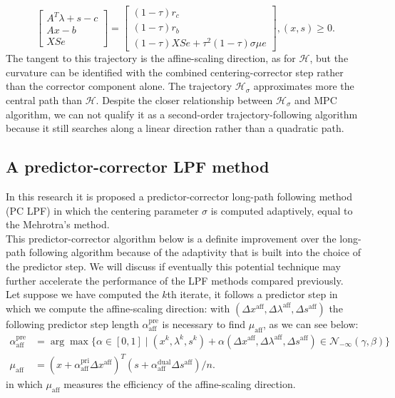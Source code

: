 \documentclass[a4paper,10 pt,titlepage,twoside]{book}
\theoremstyle{plain}
\theoremstyle{definition}
\theoremstyle{remark}
\begin{document}
\begin{equation}\label{Tt}
\begin{bmatrix}
A^{T}\lambda+s-c \\Ax-b \\XSe
\end{bmatrix}=\begin{bmatrix}
(1-\tau)r_{c}\\(1-\tau)r_{b}\\(1-\tau)XSe+\tau^{2}(1-\tau)\sigma\mu e
\end{bmatrix},(x,s)\geq0.
\end{equation}
The tangent to this trajectory is the affine-scaling direction, as for $\mathcal{H}$, but the curvature can be identified with the combined centering-corrector step rather than the corrector component alone. The trajectory $\mathcal{H}_{\sigma}$ approximates more the central path than $\mathcal{H}$. Despite the closer relationship between $\mathcal{H}_{\sigma}$  and MPC algorithm, we can not qualify it as a second-order trajectory-following algorithm because it still searches along a linear direction rather than a quadratic path.  
\subsection{A predictor-corrector LPF method}
In this research it is proposed a predictor-corrector long-path following method (PC LPF) in which the centering parameter $\sigma$ is computed adaptively, equal to the Mehrotra's method.\\
This predictor-corrector algorithm below is a definite improvement over the long-path following algorithm because of the adaptivity that is built into the choice of the predictor step. We will discuss if eventually this potential
technique may further accelerate the performance of the LPF methods compared previously.\\

Let suppose we have computed the $k$th iterate, it follows a predictor step in which we compute the affine-scaling direction: with $(\Delta x^{\text{aff}},\Delta \lambda^{\text{aff}},\Delta s^{\text{aff}})$ the following predictor step length $\alpha_{\text{aff}}^{\text{pre}}$ is necessary to find $\mu_{\text{aff}}$, as we can see below:
\begin{align}
\alpha_{\text{aff}}^{\text{pre}}&=\arg\max\{\alpha\in[0,1]\;|\;(x^{k}, \lambda^{k}, s^{k})+ \alpha(\Delta x^{\text{aff}}, \Delta\lambda^{\text{aff}}, \Delta s^{\text{aff}})\in\mathcal{N}_{-\infty}(\gamma,\beta)\}\label{QWw}\\
\mu_{\text{aff}}&= (x+\alpha_{\text{aff}}^{\text{pri}}\Delta x^{\text{aff}})^{T}(s+\alpha_{\text{aff}}^{\text{dual}}\Delta s^{\text{aff}})/n.\label{QWz}
\end{align}
in which $\mu_{\text{aff}}$ measures the efficiency of the affine-scaling direction.
\end{document}
